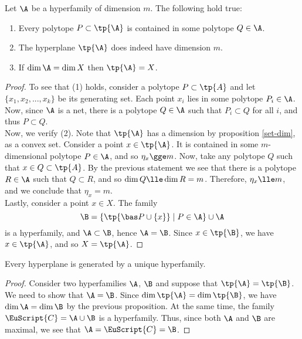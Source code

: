 \documentclass[12pt, a4paper]{article}
\newcommand{\C}{\EuScript{C}}
\begin{document}
\begin{proposition}\label{hyper-1}
    Let \(\A\) be a hyperfamily of dimension \(m\). The following hold true:
    
    \begin{enumerate}
        \item Every polytope \(P \subset \tp{\A}\) is contained in some polytope \(Q \in \A\).
        
        \item The hyperplane \(\tp{\A}\) does indeed have dimension \(m\).
        
        \item If \(\dim \A = \dim X\) then \(\tp{\A} = X\).
    \end{enumerate}
\end{proposition}
\begin{proof}
    To see that (1) holds, consider a polytope \(P \subset \tp{A}\) and let \(\{x_1, x_2, ..., x_k\}\) be its generating set. Each point \(x_i\) lies in some polytope \(P_i \in \A\). Now, since \(\A\) is a net, there is a polytope \(Q \in \A\) such that \(P_i \subset Q\) for all \(i\), and thus \(P \subset Q\).\\

    Now, we verify (2). Note that \(\tp{\A}\) has a dimension by proposition \ref{set-dim}, as a convex set. Consider a point \(x \in \tp{\A}\). It is contained in some \(m\)-dimensional polytope \(P \in \A\), and so \(\eta_x \gge m\). Now, take any polytope \(Q\) such that \(x \in Q \subset \tp{A}\). By the previous statement we see that there is a polytope \(R \in \A\) such that \(Q \subset R\), and so \(\dim Q \lle \dim R = m\). Therefore, \(\eta_x \lle m\), and we conclude that \(\eta_x = m\).\\

    Lastly, consider a point \(x \in X\). The family \[\B = \{\tp{\bas P \cup \{x\}} \mid P \in \A\} \cup \A\] is a hyperfamily, and \(\A \subset \B\), hence \(\A = \B\). Since \(x \in \tp{\B}\), we have \(x \in \tp{\A}\), and so \(X = \tp{\A}\).
\end{proof}

\begin{theorem}\label{th-hyper-unique}
    Every hyperplane is generated by a unique hyperfamily.
\end{theorem}
\begin{proof}
    Consider two hyperfamilies \(\A\), \(\B\) and suppose that \(\tp{\A} = \tp{\B}\). We need to show that \(\A = \B\). Since \(\dim \tp{\A} = \dim \tp{\B}\), we have \(\dim \A = \dim \B\) by the previous proposition. At the same time, the family \(\C = \A \cup \B\) is a hyperfamily. Thus, since both \(\A\) and \(\B\) are maximal, we see that \(\A = \C = \B\).
\end{proof}
\end{document}
